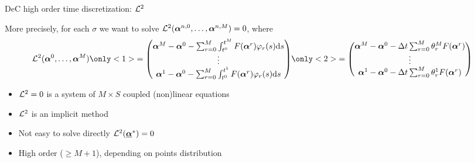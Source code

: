 \documentclass[aspectratio=169]{beamer}
\begin{document}
\begin{frame}{DeC high order time discretization: $\mathcal{L}^2$}
	\begin{minipage}{0.77\textwidth}
		More precisely, for each $\sigma$ we want to solve $\mathcal{L}^2 (\boldsymbol{\alpha}^{n,0},\dots,\boldsymbol{\alpha}^{n,M})=0$, where 
		{\begin{align*}
			\L^2(\bc^0, \dots, \bc^M) &
			\only<1>{=
			\begin{pmatrix}
				\bc^M-\bc^0 -\sum_{r=0}^M \int_{t^0}^{t^M} F(\bc^r) \varphi_r(s) \diff s\\
				\vdots\\
				\bc^1-\bc^0 - \sum_{r=0}^M \int_{t^0}^{t^1} F(\bc^r) \varphi_r(s) \diff s
			\end{pmatrix}
		}
			\only<2>{=
			\begin{pmatrix}
				\bc^M-\bc^0 -\Delta t \sum_{r=0}^M \theta_r^M F(\bc^r) \\
				\vdots\\
				\bc^1-\bc^0 - \Delta t \sum_{r=0}^M  \theta_r^1  F(\bc^r) 
			\end{pmatrix}}
		\end{align*}
	}
		\begin{itemize}
			\item $\mathcal{L}^2=0$ is a system of $M \times S$ coupled (non)linear equations
			\item $\mathcal{L}^2$ is an implicit method 
			\item Not easy to solve directly $\mathcal{L}^2(\underline{\boldsymbol{\alpha}}^*)=0$
			\item High order ($\geq M+1$), depending on points distribution
		\end{itemize}
		
	\end{minipage}\hfill
	\begin{minipage}{0.2\textwidth}
		\begin{figure}[h]
			\centering
		\end{figure}
	\end{minipage}
\end{frame}
\end{document}
